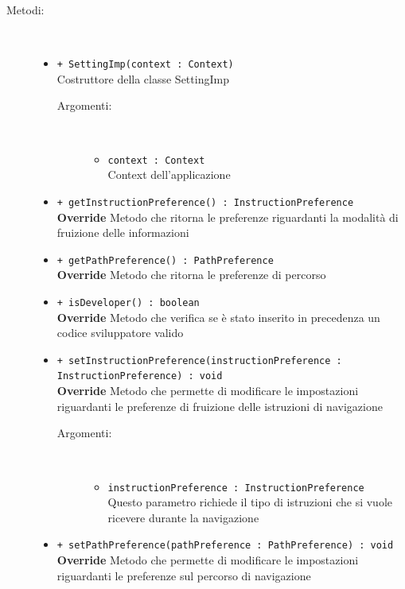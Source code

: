 \documentclass[../DefinizioneDiProdotto.tex]{subfiles}
\begin{document}
\begin{description}
\begin{itemize}
	\end{itemize}
	\item[Metodi:] \
	\begin{itemize}
		\item \texttt{+ SettingImp(context : Context)}\\
		Costruttore della classe SettingImp
		\begin{description}
			\item[Argomenti:] \
			\begin{itemize}
				\item \texttt{context : Context}\\
				Context dell'applicazione\end{itemize}
		\end{description}
		\item \texttt{+ getInstructionPreference() : InstructionPreference}\\
		\textbf{Override} Metodo che ritorna le preferenze riguardanti la modalità di fruizione delle informazioni
		\item \texttt{+ getPathPreference() : PathPreference}\\
		\textbf{Override} Metodo che ritorna le preferenze di percorso
		\item \texttt{+ isDeveloper() : boolean}\\
		\textbf{Override} Metodo che verifica se è stato inserito in precedenza un codice sviluppatore valido
		\item \texttt{+ setInstructionPreference(instructionPreference :\\ InstructionPreference) : void}\\
		\textbf{Override} Metodo che permette di modificare le impostazioni riguardanti le preferenze di fruizione delle istruzioni di navigazione
		\begin{description}
			\item[Argomenti:] \
			\begin{itemize}
				\item \texttt{instructionPreference : InstructionPreference}\\
				Questo parametro richiede il tipo di istruzioni che si vuole ricevere durante la navigazione \end{itemize}
		\end{description}
		\item \texttt{+ setPathPreference(pathPreference : PathPreference) : void}\\
		\textbf{Override} Metodo che permette di modificare le impostazioni riguardanti le preferenze sul percorso di navigazione

\end{itemize}
\end{description}
\end{document}
